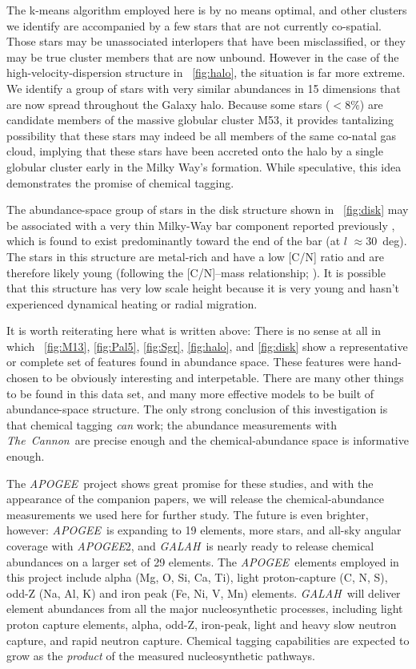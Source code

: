 \documentclass[12pt, letterpaper, preprint]{aastex}
\newcommand{\acronym}[1]{{\small{#1}}}
\newcommand{\project}[1]{\textsl{#1}}
\newcommand{\apogee}{\project{\acronym{APOGEE}}}
\newcommand{\galah}{\project{\acronym{GALAH}}}
\newcommand{\thecannon}{\project{The~Cannon}}
\begin{document}
The k-means algorithm employed here is by no means optimal, and other clusters
we identify are accompanied by a few stars that are not currently co-spatial.
Those stars may be unassociated interlopers that have been misclassified,
or they may be true cluster members that are now unbound. However in the
case of the high-velocity-dispersion structure in \figurename~\ref{fig:halo},
the situation is far more extreme. We identify a group of stars with
very similar abundances in 15 dimensions that are now spread throughout
the Galaxy halo.
Because some stars ($<8\%$) are candidate members of the massive globular
cluster M53, it provides tantalizing possibility that these stars may
indeed be all members of the same co-natal gas cloud, implying that 
these stars have been accreted onto the halo by a single globular
cluster early in the Milky Way's formation. While speculative,
this idea demonstrates the promise of chemical tagging. 

The abundance-space group of stars in the disk structure shown in
\figurename~\ref{fig:disk} may be associated with a very thin
Milky-Way bar component reported previously \citep{wegg}, which is
found to exist predominantly toward the end of the bar (at $l$
$\approx 30$~deg).
The stars in this structure are metal-rich and have a low
[C/N] ratio and are therefore likely young (following the [C/N]--mass
relationship; \citealt{martig}).
It is possible that this structure has very low scale height because
it is very young and hasn't experienced dynamical heating or radial
migration.

It is worth reiterating here what is written above:
There is no sense at all in which \figurename~\ref{fig:M13},
\ref{fig:Pal5}, \ref{fig:Sgr}, \ref{fig:halo}, and \ref{fig:disk} show
a representative or complete set of features found in abundance space.
These features were hand-chosen to be obviously interesting and
interpetable.
There are many other things to be found in this data set, and many
more effective models to be built of abundance-space structure.
The only strong conclusion of this investigation is that chemical
tagging \emph{can} work; the abundance measurements with \thecannon\ are
precise enough and the chemical-abundance space is informative enough.

The \apogee\ project shows great promise for these studies, and with
the appearance of the companion papers, we will release the
chemical-abundance measurements we used here for further study.
The future is even brighter, however: \apogee\ is expanding to 19
elements, more stars, and all-sky angular coverage with \apogee2, and
\galah\ is nearly ready to release chemical abundances on a larger set
of 29 elements.
The \apogee\ elements employed in this project include alpha
(Mg, O, Si, Ca, Ti), light proton-capture (C, N, S), odd-Z (Na, Al, K)
and iron peak (Fe, Ni, V, Mn) elements.
\galah\ will deliver element abundances from all the major
nucleosynthetic processes, including light proton capture elements,
alpha, odd-Z, iron-peak, light and heavy slow neutron capture, and
rapid neutron capture.
Chemical tagging capabilities are expected to grow as the
\emph{product} of the measured nucleosynthetic pathways.
\end{document}
